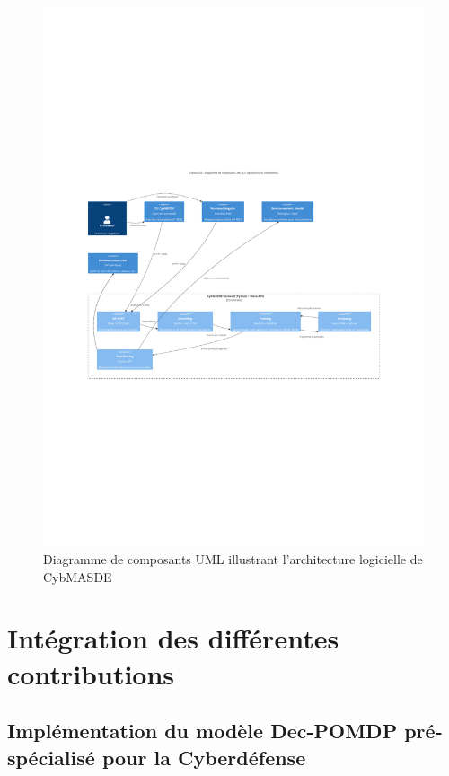 \begin{figure}
    \centering
    \includegraphics[trim={2.25cm 9cm 2.25cm 10cm},clip,width=\textwidth]{figures/CybMASDE_internal_component_diagram.pdf}
    \caption{Diagramme de composants UML illustrant l'architecture logicielle de CybMASDE}
    \label{fig:cybmasde_uml}
\end{figure}

\section{Intégration des différentes contributions}

\subsection{Implémentation du modèle Dec-POMDP pré-spécialisé pour la Cyberdéfense}

